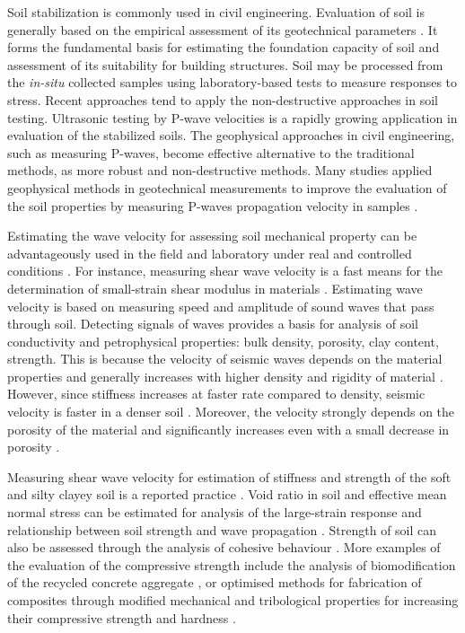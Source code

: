 \documentclass[10pt,twoside,twocolumn,a4paper]{article}
\begin{document}
Soil stabilization is commonly used in civil engineering. Evaluation of soil is generally based on the empirical assessment of its geotechnical parameters \cite{BrunarskiDohojda,CzarneckiGemert,Kallenetal2016}. It forms the fundamental basis for estimating the foundation capacity of soil and assessment of its suitability for building structures. Soil may be processed from the \emph{in-situ} collected samples using laboratory-based tests to measure responses to stress. Recent approaches tend to apply the non-destructive approaches in soil testing. Ultrasonic testing by P-wave velocities is a rapidly growing application in evaluation of the stabilized soils. The geophysical approaches in civil engineering, such as measuring P-waves, become effective alternative to the traditional methods, as more robust and non-destructive methods. Many studies applied geophysical methods in geotechnical measurements to improve the evaluation of the soil properties by measuring P-waves propagation velocity in samples \cite{Frattaetal2005,Zhaoetal2022,Zhangetal2021,Guetal2021,Weietal2022}.

Estimating the wave velocity for assessing soil mechanical property can be advantageously used in the field and laboratory under real and controlled conditions \cite{Hussien}. For instance, measuring shear wave velocity is a fast means for the determination of small-strain shear modulus in materials \cite{Leong}. Estimating wave velocity is based on measuring speed and amplitude of sound waves that pass through soil. Detecting signals of waves provides a basis for analysis of soil conductivity and petrophysical properties: bulk density, porosity, clay content, strength. This is because the velocity of seismic waves depends on the material properties and generally increases with higher density and rigidity of material \cite{ElSayed}. However, since stiffness increases at faster rate compared to density, seismic velocity is faster in a denser soil \cite{Shietal2010}. Moreover, the velocity strongly depends on the porosity of the material and significantly increases even with a small decrease in porosity \cite{Foti}. 

Measuring shear wave velocity for estimation of stiffness and strength of the soft and silty clayey soil is a reported practice \cite{Cheshomi,Wuetal2021}. Void ratio in soil and effective mean normal stress can be estimated for analysis of the large-strain response and relationship between soil strength and wave propagation \cite{Liuetal2020}. Strength of soil can also be assessed through the analysis of cohesive behaviour \cite{Gecys}. More examples of the evaluation of the compressive strength include the analysis of biomodification of the recycled concrete aggregate \cite{Grabiec2019}, or optimised methods for fabrication of composites through modified mechanical and tribological properties for increasing their compressive strength and hardness \cite{Manikandan}. 
\end{document}
